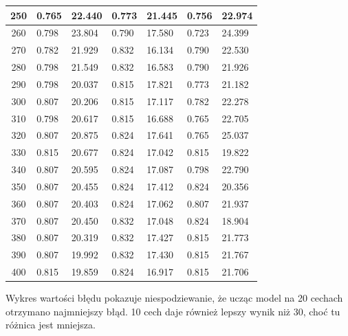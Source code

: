 \documentclass{report}
\begin{document}
\begin{minipage}{\textwidth}
\begin{longtable}{|c|l|l|l|l|l|l|}
                     250 & 0.765 & 22.440 & 0.773 & 21.445 & 0.756 & 22.974 \\ \hline
                     260 & 0.798 & 23.804 & 0.790 & 17.580 & 0.723 & 24.399 \\ \hline
                     270 & 0.782 & 21.929 & 0.832 & 16.134 & 0.790 & 22.530 \\ \hline
                     280 & 0.798 & 21.549 & 0.832 & 16.583 & 0.790 & 21.926 \\ \hline
                     290 & 0.798 & 20.037 & 0.815 & 17.821 & 0.773 & 21.182 \\ \hline
                     300 & 0.807 & 20.206 & 0.815 & 17.117 & 0.782 & 22.278 \\ \hline
                     310 & 0.798 & 20.617 & 0.815 & 16.688 & 0.765 & 22.705 \\ \hline
                     320 & 0.807 & 20.875 & 0.824 & 17.641 & 0.765 & 25.037 \\ \hline
                     330 & 0.815 & 20.677 & 0.824 & 17.042 & 0.815 & 19.822 \\ \hline
                     340 & 0.807 & 20.595 & 0.824 & 17.087 & 0.798 & 22.790 \\ \hline
                     350 & 0.807 & 20.455 & 0.824 & 17.412 & 0.824 & 20.356 \\ \hline
                     360 & 0.807 & 20.403 & 0.824 & 17.062 & 0.807 & 21.937 \\ \hline
                     370 & 0.807 & 20.450 & 0.832 & 17.048 & 0.824 & 18.904 \\ \hline
                     380 & 0.807 & 20.319 & 0.832 & 17.427 & 0.815 & 21.773 \\ \hline
                     390 & 0.807 & 19.992 & 0.832 & 17.430 & 0.815 & 21.767 \\ \hline
                     400 & 0.815 & 19.859 & 0.824 & 16.917 & 0.815 & 21.706 \\ \hline
                 \end{longtable}
    \end{minipage}

    Wykres wartości błędu pokazuje niespodziewanie, że ucząc model na 20 cechach otrzymano najmniejszy błąd.
    10 cech daje również lepszy wynik niż 30, choć tu różnica jest mniejsza.
\end{document}
